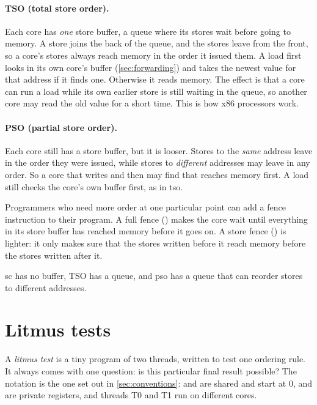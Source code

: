\paragraph{TSO (total store order).} Each core has \emph{one} store buffer, a queue where its stores wait before going to memory. A store joins the back of the queue, and the stores leave from the front, so a core's stores always reach memory in the order it issued them. A load first looks in its own core's buffer (\cref{sec:forwarding}) and takes the newest value for that address if it finds one. Otherwise it reads memory. The effect is that a core can run a load while its own earlier store is still waiting in the queue, so another core may read the old value for a short time. This is how x86 processors work.

\paragraph{PSO (partial store order).} Each core still has a store buffer, but it is looser. Stores to the \emph{same} address leave in the order they were issued, while stores to \emph{different} addresses may leave in any order. So a core that writes  and then  may find that  reaches memory first. A load still checks the core's own buffer first, as in \gls{tso}.

Programmers who need more order at one particular point can add a \gls{fence} instruction to their program. A full fence () makes the core wait until everything in its store buffer has reached memory before it goes on. A store fence () is lighter: it only makes sure that the stores written before it reach memory before the stores written after it.

\gls{sc} has no buffer, TSO has a queue, and \gls{pso} has a queue that can reorder stores to different addresses.

\section{Litmus tests}
\label{sec:notation}

A \emph{litmus test} is a tiny program of two threads, written to test one ordering rule. It always comes with one question: is this particular final result possible? The notation is the one set out in \cref{sec:conventions}:  and  are shared and start at 0,  and  are private registers, and threads T0 and T1 run on different cores.

